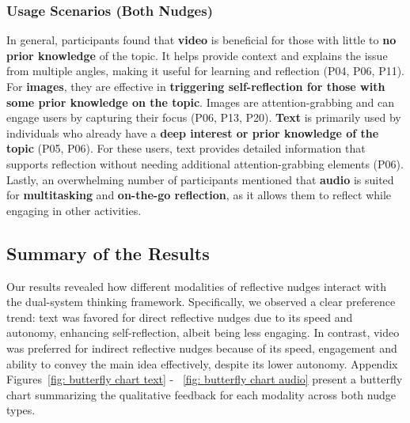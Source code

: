 \subsubsection{Usage Scenarios (Both Nudges)}
\label{sec: usage scenarios}
In general, participants found that \textbf{video} is beneficial for those with little to \textbf{no prior knowledge} of the topic. It helps provide context and explains the issue from multiple angles, making it useful for learning and reflection (P04, P06, P11). For \textbf{images}, they are effective in \textbf{triggering self-reflection for those with some prior knowledge on the topic}. Images are attention-grabbing and can engage users by capturing their focus (P06, P13, P20). 
\textbf{Text} is primarily used by individuals who already have a \textbf{deep interest or prior knowledge of the topic} (P05, P06). For these users, text provides detailed information that supports reflection without needing additional attention-grabbing elements (P06). Lastly, an overwhelming number of participants mentioned that \textbf{audio} is suited for \textbf{multitasking} and \textbf{on-the-go reflection}, as it allows them to reflect while engaging in other activities.

\subsection{Summary of the Results}
Our results revealed how different modalities of reflective nudges interact with the dual-system thinking framework. Specifically, we observed a clear preference trend: text was favored for direct reflective nudges due to its speed and autonomy, enhancing self-reflection, albeit being less engaging. In contrast, video was preferred for indirect reflective nudges because of its speed, engagement and ability to convey the main idea effectively, despite its lower autonomy. Appendix Figures~\ref{fig: butterfly chart text} - ~\ref{fig: butterfly chart audio} present a butterfly chart summarizing the qualitative feedback for each modality across both nudge types. 